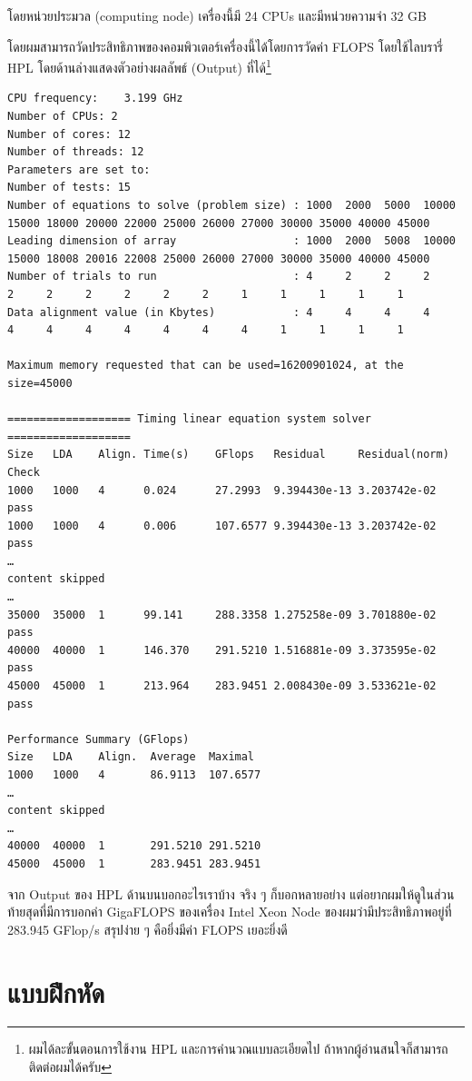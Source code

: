 \noindent โดยหน่วยประมวล (computing node) เครื่องนี้มี 24 CPUs และมีหน่วยความจำ 32 GB

โดยผมสามารถวัดประสิทธิภาพของคอมพิวเตอร์เครื่องนี้ได้โดยการวัดค่า FLOPS โดยใช้ไลบรารี่ HPL โดยด้านล่างแสดงตัวอย่างผลลัพธ์ (Output)
ที่ได้\footnote{ผมได้ละขั้นตอนการใช้งาน HPL และการคำนวณแบบละเอียดไป ถ้าหากผู้อ่านสนใจก็สามารถติดต่อผมได้ครับ}

\begin{lstlisting}[basicstyle=\ttfamily\footnotesize\linespread{0.5}]
CPU frequency:    3.199 GHz
Number of CPUs: 2
Number of cores: 12
Number of threads: 12
Parameters are set to:
Number of tests: 15
Number of equations to solve (problem size) : 1000  2000  5000  10000 15000 18000 20000 22000 25000 26000 27000 30000 35000 40000 45000
Leading dimension of array                  : 1000  2000  5008  10000 15000 18008 20016 22008 25000 26000 27000 30000 35000 40000 45000
Number of trials to run                     : 4     2     2     2     2     2     2     2     2     2     1     1     1     1     1
Data alignment value (in Kbytes)            : 4     4     4     4     4     4     4     4     4     4     4     1     1     1     1

Maximum memory requested that can be used=16200901024, at the size=45000

=================== Timing linear equation system solver ===================
Size   LDA    Align. Time(s)    GFlops   Residual     Residual(norm) Check
1000   1000   4      0.024      27.2993  9.394430e-13 3.203742e-02   pass
1000   1000   4      0.006      107.6577 9.394430e-13 3.203742e-02   pass
…
content skipped
…
35000  35000  1      99.141     288.3358 1.275258e-09 3.701880e-02   pass
40000  40000  1      146.370    291.5210 1.516881e-09 3.373595e-02   pass
45000  45000  1      213.964    283.9451 2.008430e-09 3.533621e-02   pass

Performance Summary (GFlops)
Size   LDA    Align.  Average  Maximal
1000   1000   4       86.9113  107.6577
…
content skipped
…
40000  40000  1       291.5210 291.5210
45000  45000  1       283.9451 283.9451
\end{lstlisting}

จาก Output ของ HPL ด้านบนบอกอะไรเราบ้าง จริง ๆ ก็บอกหลายอย่าง แต่อยากผมให้ดูในส่วนท้ายสุดที่มีการบอกค่า GigaFLOPS ของเครื่อง
Intel Xeon Node ของผมว่ามีประสิทธิภาพอยู่ที่ 283.945 GFlop/s สรุปง่าย ๆ คือยิ่งมีค่า FLOPS เยอะยิ่งดี

\section{แบบฝึกหัด}

